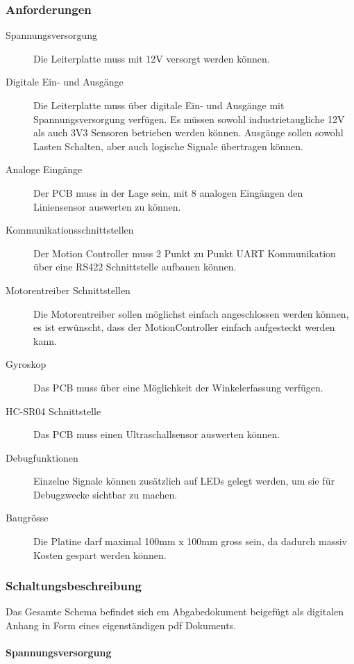 \documentclass[main.  tex]{subfiles} %
\begin{document}
\subsubsection*{Anforderungen}

\begin{description}
    \item[Spannungsversorgung] Die Leiterplatte muss mit 12V versorgt werden können.
    \item[Digitale Ein- und Ausgänge] Die Leiterplatte muss über digitale Ein- und
          Ausgänge mit Spannungsversorgung verfügen. Es müssen sowohl industrietaugliche
          12V als auch 3V3 Sensoren betrieben werden können. Ausgänge sollen sowohl
          Lasten Schalten, aber auch logische Signale übertragen können.
    \item[Analoge Eingänge] Der PCB muss in der Lage sein, mit 8 analogen Eingängen den
          Liniensensor auswerten zu können.
    \item[Kommunikationsschnittstellen] Der Motion Controller muss 2 Punkt zu Punkt UART
          Kommunikation über eine RS422 Schnittstelle aufbauen können.
    \item[Motorentreiber Schnittstellen] Die Motorentreiber sollen möglichst einfach
          angeschlossen werden können, es ist erwünscht, dass der MotionController
          einfach aufgesteckt werden kann.
    \item[Gyroskop] Das PCB muss über eine Möglichkeit der Winkelerfassung verfügen.
    \item[HC-SR04 Schnittstelle] Das PCB muss einen Ultraschallsensor auswerten können.
    \item[Debugfunktionen] Einzelne Signale können zusätzlich auf LEDs gelegt werden, um
          sie für Debugzwecke sichtbar zu machen.
    \item[Baugrösse] Die Platine darf maximal 100mm x 100mm gross sein, da dadurch massiv
          Kosten gespart werden können.
\end{description}

\newpage

\subsubsection*{Schaltungsbeschreibung}

Das Gesamte Schema befindet sich em Abgabedokument beigefügt als digitalen
Anhang in Form eines eigenständigen pdf Dokuments.

\paragraph{Spannungsversorgung}
\end{document}
